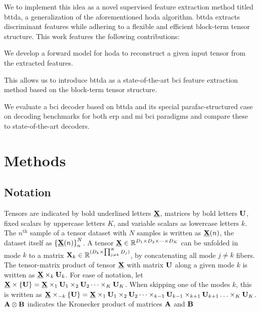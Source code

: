 \documentclass[twocolumn]{article}
\begin{document}
We to implement this idea as a novel supervised feature
extraction method titled \ac{bttda}, a generalization of the aforementioned
\ac{hoda} algorithm.
\Ac{bttda} extracts discriminant features while adhering to a
flexible and efficient block-term tensor structure.
This work features the following contributions:
\begin{enumerate*}[label={\arabic*)}]
	\item We develop a forward model for \ac{hoda} to reconstruct a
	      given input tensor from the extracted features.
	\item This allows us to introduce \ac{bttda} as a state-of-the-art \ac{bci}
	      feature extraction method based on the block-term tensor structure.
	\item We evaluate a \ac{bci} decoder based on \ac{bttda} and its special
	      \ac{parafac}-structured case on decoding benchmarks for both \ac{erp}
	      and \ac{mi}
	      \ac{bci} paradigms and compare these to state-of-the-art decoders.
\end{enumerate*}

\section{Methods}

\subsection{Notation}
Tensors are indicated by bold underlined letters $\ten{X}$, matrices by bold
letters $\mat{U}$, fixed scalars by uppercase letters $K$, and variable
scalars as lowercase letters $k$.
The $n^\text{th}$ sample of a tensor dataset with $N$ samples is written as
$\ten{X}(n)$, the dataset itself as ${\{\ten{X}(n)\}}_n^N$.
A tensor $\ten{X}\in \mathbb{R}^{D_1\times D_2 \times \cdots \times D_K}$ can be
unfolded in mode $k$ to a matrix
$\mat{X}_k\in\mathbb{R}^{(D_k\times\prod_{j\neq k}^K D_j)}$, by concatenating
all mode $j\neq k$ fibers.
The tensor-matrix product of tensor $\ten{X}$ with matrix $\mat{U}$ along a
given mode $k$ is written as $\ten{X}\mpr{\mat{U}}{k}$. For ease of notation, let
$\ten{X}\mmpr{\mat{U}} =
	\ten{X}\mpr{\mat{U}}{1}\mpr{\mat{U}}{2}\cdots\mpr{\mat{U}}{K}$.
When skipping one of the modes $k$, this is
written as $\ten{X}\mmprs{\mat{U}}{k} =
	\ten{X}\mpr{\mat{U}}{1}\mpr{\mat{U}}{2}\cdots\mpr{\mat{U}}{k-1}\mpr{\mat{U}}{k+1}\ldots\mpr{\mat{U}}{K}$.
$\mat{A}\otimes\mat{B}$ indicates the Kronecker product of matrices $\mat{A}$ and $\mat{B}$
\end{document}
